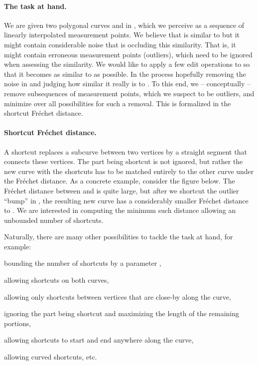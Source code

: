 \documentclass[12pt]{article}
\newcommand{\Frechet}{Fr\'{e}c{h}e{}t\xspace}\providecommand{\Arr}{\mathop{\mathrm{\EuScript{A}}}}
\numberwithin{figure}{section}
\numberwithin{equation}{section}
\begin{document}
\paragraph{The task at hand.} We are given two polygonal curves 
and  in , which we perceive as a sequence of linearly
interpolated measurement points. We believe that  is similar to
 but it might contain considerable noise that is occluding this
similarity. That is, it might contain erroneous measurement points
(outliers), which need to be ignored when assessing the similarity.
We would like to apply a few edit operations to  so that it
becomes as similar to  as possible. In the process hopefully
removing the noise in  and judging how similar it really is to
.  To this end, we -- conceptually -- remove subsequences of
measurement points, which we suspect to be outliers, and minimize over
all possibilities for such a removal. This is formalized in the
shortcut \Frechet distance.


\paragraph{Shortcut \Frechet distance.}
A shortcut replaces a subcurve between two vertices by a straight
segment that connects these vertices.  The part being shortcut is not
ignored, but rather the new curve with the shortcuts has to be matched
entirely to the other curve under the \Frechet distance.  As a
concrete example, consider the figure below.  The \Frechet distance
between  and  is quite large, but after we shortcut the
outlier ``bump'' in , the resulting new curve  has a
considerably smaller \Frechet distance to .  We are interested in
computing the minimum such distance allowing an unbounded number of
shortcuts.

Naturally, there are many other possibilities to tackle the task at
hand, for example:
\begin{compactenum}[(i)]
    \item bounding the number of shortcuts by a parameter ,
    \item allowing shortcuts on both curves,
    \item allowing only shortcuts between vertices that are close-by
    along the curve,
    \item ignoring the part being shortcut and maximizing the length
    of the remaining portions,
    \item allowing shortcuts to start and end anywhere along the
    curve,
    \item allowing curved shortcuts, etc.
\end{compactenum}
\end{document}
